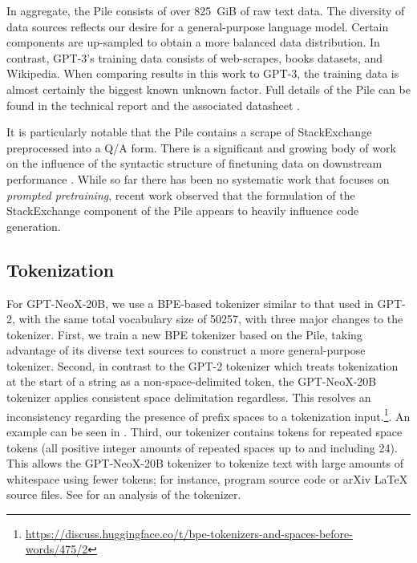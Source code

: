 \documentclass[11pt]{article}
\newcommand{\model}{GPT-NeoX-20B}
\begin{document}
In aggregate, the Pile consists of over 825~GiB of raw text data. The diversity of data sources reflects our desire for a general-purpose language model. Certain components are up-sampled to obtain a more balanced data distribution. In contrast, GPT-3's training data consists of web-scrapes, books datasets, and Wikipedia. When comparing results in this work to GPT-3, the training data is almost certainly the biggest known unknown factor. Full details of the Pile can be found in the technical report \citep{gao2020pile} and the associated datasheet \citep{biderman2022datasheet}.

It is particularly notable that the Pile contains a scrape of StackExchange preprocessed into a Q/A form. There is a significant and growing body of work on the influence of the syntactic structure of finetuning data on downstream performance \citep{zhong2021adapting,tan2021msp,sanh2021multitask,wei2021finetuned}. While so far there has been no systematic work that focuses on \textit{prompted pretraining}, recent work \citep{biderman2022neural} observed that the formulation of the StackExchange component of the Pile appears to heavily influence code generation. 

\subsection{Tokenization}
\label{sec:tokenization}

For \model{}, we use a BPE-based tokenizer similar to that used in GPT-2, with the same total vocabulary size of 50257, with three major changes to the tokenizer. First, we train a new BPE tokenizer based on the Pile, taking advantage of its diverse text sources to construct a more general-purpose tokenizer. Second, in contrast to the GPT-2 tokenizer which treats tokenization at the start of a string as a non-space-delimited token, the \model{} tokenizer applies consistent space delimitation regardless. This resolves an inconsistency regarding the presence of prefix spaces to a tokenization input.\footnote{\url{https://discuss.huggingface.co/t/bpe-tokenizers-and-spaces-before-words/475/2}}. An example can be seen in .
Third, our tokenizer contains tokens for repeated space tokens (all positive  integer amounts of repeated spaces up to and including 24). This allows the \model{} tokenizer to tokenize text with large amounts of whitespace using fewer tokens; for instance, program source code or arXiv \LaTeX{} source files. See  for an analysis of the tokenizer.
\end{document}
